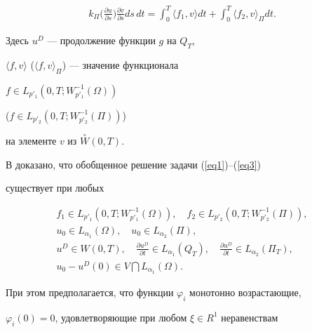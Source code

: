 \begin{defnnonum}
\begin{multline}
k_{\Pi}\bigg(\frac{\partial u}{\partial s}\bigg)


\frac{\partial v}{\partial s} ds\,dt


=\int^{T}_{0} \langle f_{1},v \rangle dt+


\int^{T}_{0} \langle f_{2},v \rangle_{\Pi} dt.


\end{multline}


Здесь $u^{D}$ --- продолжение функции $g$ на $Q_{T}$,


$\langle f,v \rangle$ ($\langle f,v \rangle_{\Pi}$) --- значение функционала


$f \in L_{p'_1}(0,T;W^{-1}_{p'_1}(\Omega))$


($f \in L_{p'_2}(0,T;W^{-1}_{p'_2}(\Pi))$)


на элементе $v$ из $ \overset{\circ}{W}(0,T)$.


\end{defnnonum}





В \cite{2} доказано, что обобщенное решение задачи (\ref{eq1})--(\ref{eq3})


существует при любых


\begin{gather*}


f_{1} \in L_{ p'_{1}}(0,T;W_{p'_{1}}^{-1}(\Omega)), \quad


f_{2} \in L_{ p'_{2}}(0,T;W_{p'_{2}}^{-1}(\Pi)), \\


%


u_{0} \in L_{\alpha_{1}}(\Omega), \quad u_{0} \in L_{\alpha_{2}}(\Pi), \\


%


u^{D} \in W(0,T), \quad


\frac{\partial u^{D}}{\partial t} \in L_{\alpha_{1}}(Q_{T}), \quad


\frac{\partial u^{D}}{\partial t} \in L_{\alpha_{2}}(\Pi_{T}), \\


%


u_{0}-u^{D}(0) \in V \bigcap L_{\alpha_{1}}(\Omega).


\end{gather*}


При этом предполагается, что функции $\varphi_{i}$ монотонно возрастающие, 


$\varphi_{i}(0)=0$, удовлетворяющие при любом $\xi \in R^{1}$ неравенствам


